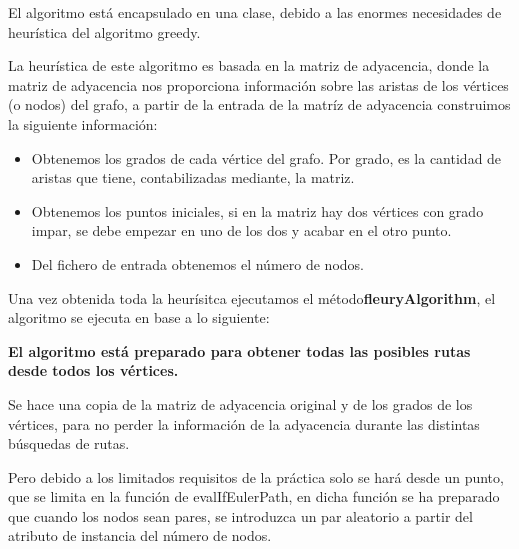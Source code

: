 El algoritmo está encapsulado en una clase, debido a las enormes necesidades de heurística del algoritmo greedy.

La heurística de este algoritmo es basada en la matriz de adyacencia, donde la matriz de adyacencia nos proporciona información sobre las aristas de los vértices (o nodos) del grafo, a partir de la entrada de la matríz de adyacencia construimos la siguiente información:

\begin{itemize}
    \item Obtenemos los grados de cada vértice del grafo. Por grado, es la cantidad de aristas que tiene, contabilizadas mediante, la matriz.
    \item Obtenemos los puntos iniciales, si en la matriz hay dos vértices con grado impar, se debe empezar en uno de los dos y acabar en el otro punto.
    \item Del fichero de entrada obtenemos el número de nodos.
\end{itemize}

Una vez obtenida toda la heurísitca ejecutamos el método\textbf{fleuryAlgorithm}, el algoritmo se ejecuta en base a lo siguiente:

\textbf{El algoritmo está preparado para obtener todas las posibles rutas desde todos los vértices.} 

Se hace una copia de la matriz de adyacencia original y de los grados de los vértices, para no perder la información de la adyacencia durante las distintas búsquedas de rutas.

Pero debido a los limitados requisitos de la práctica solo se hará desde un punto, que se limita en la función de evalIfEulerPath, en dicha función se ha preparado que cuando los nodos sean pares, se introduzca un par aleatorio a partir del atributo de instancia del número de nodos.

